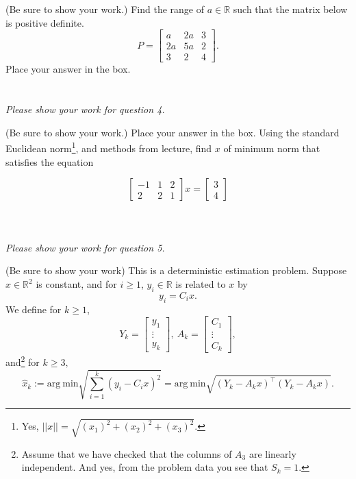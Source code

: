 \documentclass[letterpaper]{article}
\newcommand{\real}{\mathbb R}  %
\begin{document}
\newpage

 (Be sure to show your work.) Find the range of $a\in \real$ such that the matrix below is positive definite.
$$P= \left[ \begin{array}{rrr}  a&   2a&   3\\  2a&   5a&   2\\  3&   2&  4\end{array}\right].$$ Place your answer in the box.\\ \\

\\

\newpage
\textit{Please show your work for question 4.}
\newpage

 (Be sure to show your work.)  Place your answer in the box.  Using the standard Euclidean norm\footnote{Yes, $||x||=\sqrt{(x_1)^2 + (x_2)^2 + (x_3)^2}$.}, and methods from lecture, find $x$ of minimum norm that satisfies the equation

$$ \left[ \begin{array}{rrr}  -1&   1 & 2\\  2&  2 & 1 \end{array} \right] x = \left[ \begin{array}{r}  3 \\4\end{array} \right]$$ \\ \\

\\

\newpage
\textit{Please show your work for question 5.}
\newpage

 (Be sure to show your work) This is a deterministic estimation problem. Suppose $x \in \real^2$ is constant, and for $i \ge 1$, $y_i \in \real$ is related to $x$ by
$$y_i = C_i x.$$
We define for $k\ge 1$,
$$ Y_k =\left[ \begin{array}{c} y_1 \\ \vdots \\ y_k \end{array} \right],~   A_k = \left[ \begin{array}{c} C_1 \\ \vdots \\ C_k  \end{array}  \right],$$
and\footnote{Assume that we have checked that the columns of $A_3$ are linearly independent. And yes, from the problem data you see that $S_k=1$.} for $k \ge 3,$ $$ \widehat{x}_k :=\mathrm{arg~min} \sqrt{\sum_{i=1}^k \left(y_i - C_i x \right)^2}=\mathrm{arg~min} \sqrt{(Y_k - A_k x)^\top (Y_k - A_k x)}.$$
\end{document}
